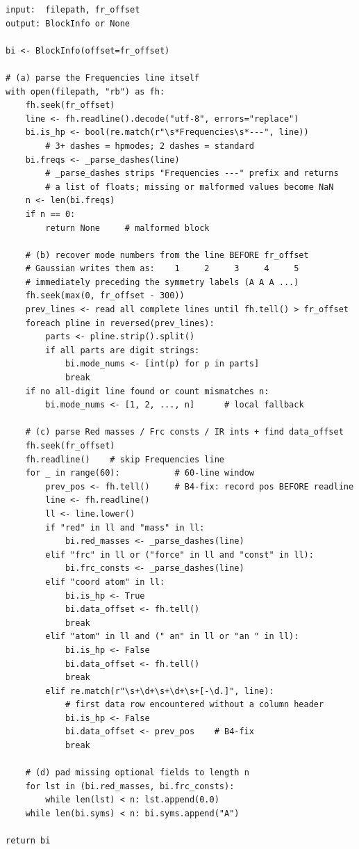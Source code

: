 \documentclass[10pt,a4paper,twoside]{article}
\newcommand{\fn}[1]{\texttt{#1}}
\begin{document}
\begin{lstlisting}[style=pseudo,
  caption={Per-block metadata parser. Implementation:
           \protect\fn{logio.\_read\_block\_at\_freq\_line}.}]
input:  filepath, fr_offset
output: BlockInfo or None

bi <- BlockInfo(offset=fr_offset)

# (a) parse the Frequencies line itself
with open(filepath, "rb") as fh:
    fh.seek(fr_offset)
    line <- fh.readline().decode("utf-8", errors="replace")
    bi.is_hp <- bool(re.match(r"\s*Frequencies\s*---", line))
        # 3+ dashes = hpmodes; 2 dashes = standard
    bi.freqs <- _parse_dashes(line)
        # _parse_dashes strips "Frequencies ---" prefix and returns
        # a list of floats; missing or malformed values become NaN
    n <- len(bi.freqs)
    if n == 0:
        return None     # malformed block

    # (b) recover mode numbers from the line BEFORE fr_offset
    # Gaussian writes them as:    1     2     3     4     5
    # immediately preceding the symmetry labels (A A A ...)
    fh.seek(max(0, fr_offset - 300))
    prev_lines <- read all complete lines until fh.tell() > fr_offset
    foreach pline in reversed(prev_lines):
        parts <- pline.strip().split()
        if all parts are digit strings:
            bi.mode_nums <- [int(p) for p in parts]
            break
    if no all-digit line found or count mismatches n:
        bi.mode_nums <- [1, 2, ..., n]      # local fallback

    # (c) parse Red masses / Frc consts / IR ints + find data_offset
    fh.seek(fr_offset)
    fh.readline()    # skip Frequencies line
    for _ in range(60):           # 60-line window
        prev_pos <- fh.tell()     # B4-fix: record pos BEFORE readline
        line <- fh.readline()
        ll <- line.lower()
        if "red" in ll and "mass" in ll:
            bi.red_masses <- _parse_dashes(line)
        elif "frc" in ll or ("force" in ll and "const" in ll):
            bi.frc_consts <- _parse_dashes(line)
        elif "coord atom" in ll:
            bi.is_hp <- True
            bi.data_offset <- fh.tell()
            break
        elif "atom" in ll and (" an" in ll or "an " in ll):
            bi.is_hp <- False
            bi.data_offset <- fh.tell()
            break
        elif re.match(r"\s+\d+\s+\d+\s+[-\d.]", line):
            # first data row encountered without a column header
            bi.is_hp <- False
            bi.data_offset <- prev_pos    # B4-fix
            break

    # (d) pad missing optional fields to length n
    for lst in (bi.red_masses, bi.frc_consts):
        while len(lst) < n: lst.append(0.0)
    while len(bi.syms) < n: bi.syms.append("A")

return bi
\end{lstlisting}
\end{document}
